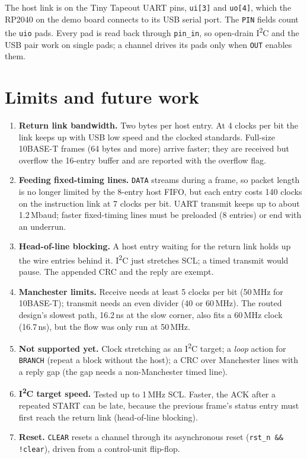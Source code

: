 \documentclass[11pt,a4paper]{article}
\newcommand{\sig}[1]{\texttt{#1}}
\begin{document}
The host link is on the Tiny Tapeout UART pins, \sig{ui[3]} and \sig{uo[4]}, which the RP2040 on the demo board connects to its USB serial port. The \sig{PIN} fields count the \sig{uio} pads. Every pad is read back through \sig{pin\_in}, so open-drain I\textsuperscript{2}C and the USB pair work on single pads; a channel drives its pads only when \sig{OUT} enables them.

\section{Limits and future work}

\begin{enumerate}
\item \textbf{Return link bandwidth.} Two bytes per host entry. At 4 clocks per bit the link keeps up with USB low speed and the clocked standards. Full-size 10BASE-T frames (64 bytes and more) arrive faster; they are received but overflow the 16-entry buffer and are reported with the overflow flag.
\item \textbf{Feeding fixed-timing lines.} \sig{DATA} streams during a frame, so packet length is no longer limited by the 8-entry host FIFO, but each entry costs 140 clocks on the instruction link at 7 clocks per bit. UART transmit keeps up to about 1.2\,Mbaud; faster fixed-timing lines must be preloaded (8 entries) or end with an underrun.
\item \textbf{Head-of-line blocking.} A host entry waiting for the return link holds up the wire entries behind it. I\textsuperscript{2}C just stretches SCL; a timed transmit would pause. The appended CRC and the reply are exempt.
\item \textbf{Manchester limits.} Receive needs at least 5 clocks per bit (50\,MHz for 10BASE-T); transmit needs an even divider (40 or 60\,MHz). The routed design's slowest path, 16.2\,ns at the slow corner, also fits a 60\,MHz clock (16.7\,ns), but the flow was only run at 50\,MHz.
\item \textbf{Not supported yet.} Clock stretching as an I\textsuperscript{2}C target; a \emph{loop} action for \sig{BRANCH} (repeat a block without the host); a CRC over Manchester lines with a reply gap (the gap needs a non-Manchester timed line).
\item \textbf{I\textsuperscript{2}C target speed.} Tested up to 1\,MHz SCL. Faster, the ACK after a repeated START can be late, because the previous frame's status entry must first reach the return link (head-of-line blocking).
\item \textbf{Reset.} \sig{CLEAR} resets a channel through its asynchronous reset (\sig{rst\_n \&\& !clear}), driven from a control-unit flip-flop.
\end{enumerate}
\end{document}
